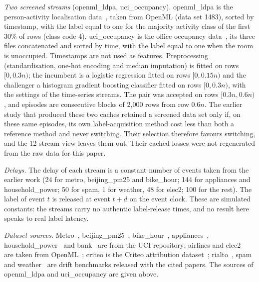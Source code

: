\documentclass[10pt]{article}
\theoremstyle{plain}
\theoremstyle{definition}
\begin{document}
\emph{Two screened streams} (openml\_ldpa, uci\_occupancy). openml\_ldpa is the person-activity localisation data~\citep{uci_ldpa}, taken from OpenML (data set 1483), sorted by timestamp, with the label equal to one for the majority activity class of the first $30\%$ of rows (class code 4). uci\_occupancy is the office occupancy data~\citep{uci_occupancy,candanedo2016occupancy}, its three files concatenated and sorted by time, with the label equal to one when the room is unoccupied. Timestamps are not used as features. Preprocessing (standardisation, one-hot encoding and median imputation) is fitted on rows $[0,0.3n)$; the incumbent is a logistic regression fitted on rows $[0,0.15n)$ and the challenger a histogram gradient boosting classifier fitted on rows $[0,0.3n)$, with the settings of the time-series streams. The pair was accepted on rows $[0.3n,0.6n)$, and episodes are consecutive blocks of 2{,}000 rows from row $0.6n$. The earlier study that produced these two caches retained a screened data set only if, on these same episodes, its own label-acquisition method cost less than both a reference method and never switching. Their selection therefore favours switching, and the 12-stream view leaves them out. Their cached losses were not regenerated from the raw data for this paper.

\emph{Delays.} The delay of each stream is a constant number of events taken from the earlier work (24 for metro, beijing\_pm25 and bike\_hour; 144 for appliances and household\_power; 50 for spam, 1 for weather, 48 for elec2; 100 for the rest). The label of event $t$ is released at event $t+d$ on the event clock. These are simulated constants: the streams carry no authentic label-release times, and no result here speaks to real label latency.

\emph{Dataset sources.} Metro~\citep{uci_metro}, beijing\_pm25~\citep{uci_beijing}, bike\_hour~\citep{uci_bike}, appliances~\citep{uci_appliances}, household\_power~\citep{uci_household} and bank~\citep{uci_bank} are from the UCI repository; airlines and elec2~\citep{harries1999splice} are taken from OpenML~\citep{vanschoren2014openml}; criteo is the Criteo attribution dataset~\citep{diemert2017attribution}; rialto~\citep{losing2016knn}, spam~\citep{katakis2010tracking} and weather~\citep{elwell2011incremental} are drift benchmarks released with the cited papers. The sources of openml\_ldpa and uci\_occupancy are given above.

\begin{table}[!htbp]
\caption{Provenance for the 14 cached streams. LR = logistic regression; HGB = histogram gradient boosting. For the seven benchmark streams, model descriptions follow the construction script accompanying the byte-identical cached loss files from an earlier registered run. For openml\_ldpa and uci\_occupancy they follow the records of an earlier screening run.}\label{tab:streamprov}
\centering\small

\end{table}
\end{document}

